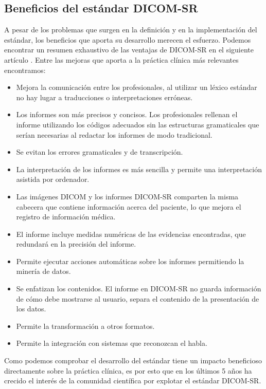 \subsection{Beneficios del estándar DICOM-SR}\label{dicom:beneficios}
A pesar de los problemas que surgen en la definición y en la implementación del estándar, los beneficios que aporta su desarrollo merecen el esfuerzo. Podemos encontrar un resumen exhaustivo de las ventajas de DICOM-SR en el siguiente artículo \cite{noumeir2006benefits}. Entre las mejoras que aporta a la práctica clínica más relevantes encontramos: 
\begin{itemize}
	\item Mejora la comunicación entre los profesionales, al utilizar un léxico estándar no hay lugar a traducciones o 	interpretaciones erróneas. 
	\item Los informes son más precisos y concisos. Los profesionales rellenan el informe utilizando los códigos adecuados sin 	las estructuras gramaticales que serían necesarias al redactar los informes de modo tradicional. 
	\item Se evitan los errores gramaticales y de transcripción.
	\item La interpretación de los informes es más sencilla y permite una interpretación asistida por ordenador. 
	\item Las imágenes DICOM y los informes DICOM-SR comparten la misma cabecera que contiene información acerca del paciente, 	lo que mejora el registro de información médica.
	\item El informe incluye medidas numéricas de las evidencias encontradas, que redundará en la precisión del informe.
	\item Permite ejecutar acciones automáticas sobre los informes permitiendo la minería de datos.
	\item Se enfatizan los contenidos. El informe en DICOM-SR no guarda información de cómo debe mostrarse al usuario, separa el contenido de la presentación de los datos.
	\item Permite la transformación a otros formatos. 
	\item Permite la integración con sistemas que reconozcan el habla. 
\end{itemize} 
Como podemos comprobar el desarrollo del estándar tiene un impacto beneficioso directamente sobre la práctica clínica, es por esto que en los últimos 5 años ha crecido el interés de la comunidad científica por explotar el estándar DICOM-SR.\par

